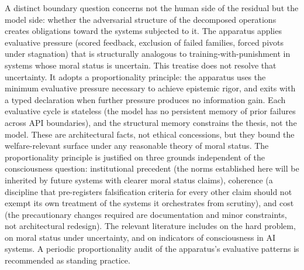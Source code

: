 \documentclass[11pt]{article}
\begin{document}
A distinct boundary question concerns not the human side of the residual but the model side: whether the adversarial structure of the decomposed operations creates obligations toward the systems subjected to it. The apparatus applies evaluative pressure (scored feedback, exclusion of failed families, forced pivots under stagnation) that is structurally analogous to training-with-punishment in systems whose moral status is uncertain. This treatise does not resolve that uncertainty. It adopts a proportionality principle: the apparatus uses the minimum evaluative pressure necessary to achieve epistemic rigor, and exits with a typed declaration when further pressure produces no information gain. Each evaluative cycle is stateless (the model has no persistent memory of prior failures across API boundaries), and the structural memory constrains the thesis, not the model. These are architectural facts, not ethical concessions, but they bound the welfare-relevant surface under any reasonable theory of moral status. The proportionality principle is justified on three grounds independent of the consciousness question: institutional precedent (the norms established here will be inherited by future systems with clearer moral status claims), coherence (a discipline that pre-registers falsification criteria for every other claim should not exempt its own treatment of the systems it orchestrates from scrutiny), and cost (the precautionary changes required are documentation and minor constraints, not architectural redesign). The relevant literature includes \citet{chalmers1996} on the hard problem, \citet{schwitzgebel2023} on moral status under uncertainty, and \citet{butlin2023} on indicators of consciousness in AI systems. A periodic proportionality audit of the apparatus's evaluative patterns is recommended as standing practice.
\end{document}
